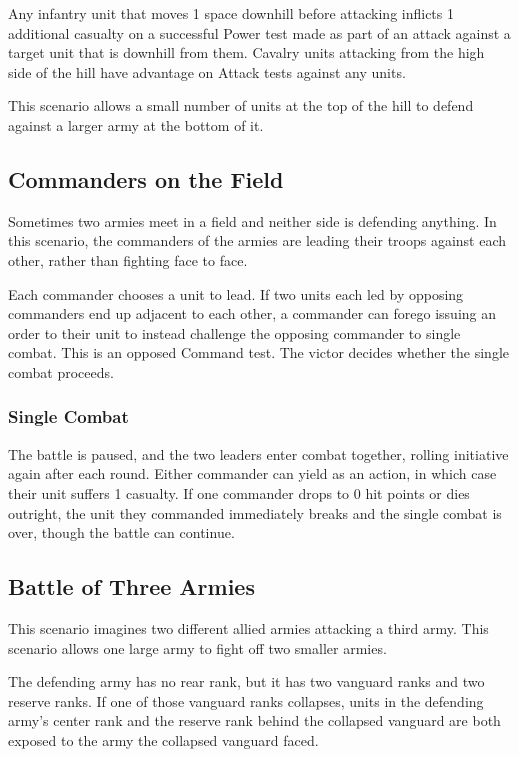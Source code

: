 \documentclass[10pt,a4paper,twoside,bg=print,twocolumn,openany,nodeprecatedcode]{dndbook}
\begin{document}
Any infantry unit that moves 1 space downhill before attacking inflicts 1 additional casualty on a successful Power test made as part of an attack against a target unit that is downhill from them. Cavalry units attacking from the high side of the hill have advantage on Attack tests against any units.

This scenario allows a small number of units at the top of the hill to defend against a larger army at the bottom of it.

\subsection{Commanders on the Field}
Sometimes two armies meet in a field and neither side is defending anything. In this scenario, the commanders of the armies are leading their troops against each other, rather than fighting face to face.

Each commander chooses a unit to lead. If two units each led by opposing commanders end up adjacent to each other, a commander can forego issuing an order to their unit to instead challenge the opposing commander to single combat. This is an opposed Command test. The victor decides whether the single combat proceeds.

\subsubsection{Single Combat}
The battle is paused, and the two leaders enter combat together, rolling initiative again after each round. Either commander can yield as an action, in which case their unit suffers 1 casualty. If one commander drops to 0 hit points or dies outright, the unit they commanded immediately breaks and the single combat is over, though the battle can continue.

\subsection{Battle of Three Armies}
This scenario imagines two different allied armies attacking a third army. This scenario allows one large army to fight off two smaller armies.

The defending army has no rear rank, but it has two vanguard ranks and two reserve ranks. If one of those vanguard ranks collapses, units in the defending army's center rank and the reserve rank behind the collapsed vanguard are both exposed to the army the collapsed vanguard faced.
\end{document}
